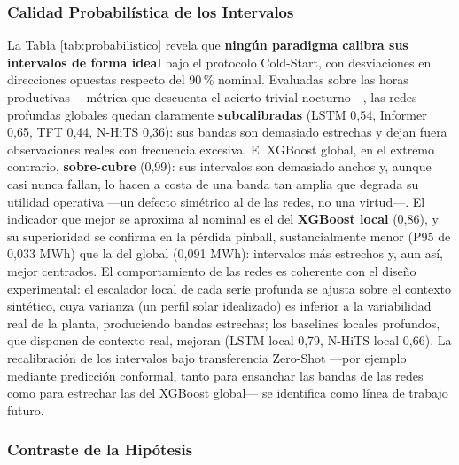 \FloatBarrier
\subsubsection{Calidad Probabilística de los Intervalos}

\begin{table}[htbp]
  \centering
  
  \caption{\label{tab:probabilistico} Calidad probabilística de los intervalos de 90\,\% (roll-out 7 días, ventana operacional). La \textit{cobertura con noche} incluye las horas nocturnas, donde el forzamiento físico a cero garantiza un acierto trivial; la \textit{cobertura diurna} (solo horas con $y>0$) es la medida honesta del mérito probabilístico.}
\end{table}

La Tabla \ref{tab:probabilistico} revela que \textbf{ningún paradigma calibra sus intervalos de forma ideal} bajo el protocolo Cold-Start, con desviaciones en direcciones opuestas respecto del 90\,\% nominal. Evaluadas sobre las horas productivas —métrica que descuenta el acierto trivial nocturno—, las redes profundas globales quedan claramente \textbf{subcalibradas} (LSTM 0,54, Informer 0,65, TFT 0,44, N-HiTS 0,36): sus bandas son demasiado estrechas y dejan fuera observaciones reales con frecuencia excesiva. El XGBoost global, en el extremo contrario, \textbf{sobre-cubre} (0,99): sus intervalos son demasiado anchos y, aunque casi nunca fallan, lo hacen a costa de una banda tan amplia que degrada su utilidad operativa —un defecto simétrico al de las redes, no una virtud—. El indicador que mejor se aproxima al nominal es el del \textbf{XGBoost local} (0,86), y su superioridad se confirma en la pérdida pinball, sustancialmente menor (P95 de 0,033 MWh) que la del global (0,091 MWh): intervalos más estrechos y, aun así, mejor centrados. El comportamiento de las redes es coherente con el diseño experimental: el escalador local de cada serie profunda se ajusta sobre el contexto sintético, cuya varianza (un perfil solar idealizado) es inferior a la variabilidad real de la planta, produciendo bandas estrechas; los baselines locales profundos, que disponen de contexto real, mejoran (LSTM local 0,79, N-HiTS local 0,66). La recalibración de los intervalos bajo transferencia Zero-Shot —por ejemplo mediante predicción conformal, tanto para ensanchar las bandas de las redes como para estrechar las del XGBoost global— se identifica como línea de trabajo futuro.

\FloatBarrier
\subsubsection{Contraste de la Hipótesis}

